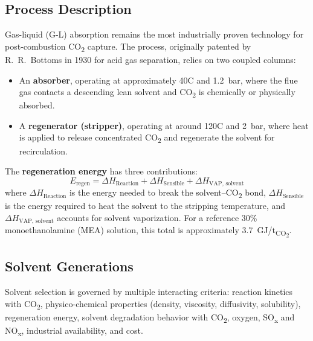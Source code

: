 \subsection{Process Description}

Gas-liquid (G-L) absorption remains the most industrially proven technology for 
post-combustion CO\textsubscript{2} capture. The process, originally patented by 
R.~R.~Bottoms in 1930 for acid gas separation, relies on two coupled columns:

\begin{itemize}
    \item An \textbf{absorber}, operating at approximately 40\textdegree C and 
    1.2~bar, where the flue gas contacts a descending lean solvent and CO\textsubscript{2} 
    is chemically or physically absorbed.
    \item A \textbf{regenerator (stripper)}, operating at around 120\textdegree C and 
    2~bar, where heat is applied to release concentrated CO\textsubscript{2} and 
    regenerate the solvent for recirculation.
\end{itemize}

The \textbf{regeneration energy} has three contributions:
\[
E_{\text{regen}} = \Delta H_{\text{Reaction}} + \Delta H_{\text{Sensible}} + \Delta H_{\text{VAP, solvent}}
\]
where $\Delta H_{\text{Reaction}}$ is the energy needed to break the solvent--CO\textsubscript{2} 
bond, $\Delta H_{\text{Sensible}}$ is the energy required to heat the solvent to the 
stripping temperature, and $\Delta H_{\text{VAP, solvent}}$ accounts for solvent 
vaporization. For a reference 30\% monoethanolamine (MEA) solution, this total is 
approximately 3.7~GJ/t\textsubscript{CO\textsubscript{2}}.

\subsection{Solvent Generations}

Solvent selection is governed by multiple interacting criteria: reaction kinetics with 
CO\textsubscript{2}, physico-chemical properties (density, viscosity, diffusivity, 
solubility), regeneration energy, solvent degradation behavior with CO\textsubscript{2}, 
oxygen, SO\textsubscript{x} and NO\textsubscript{x}, industrial availability, and cost.

